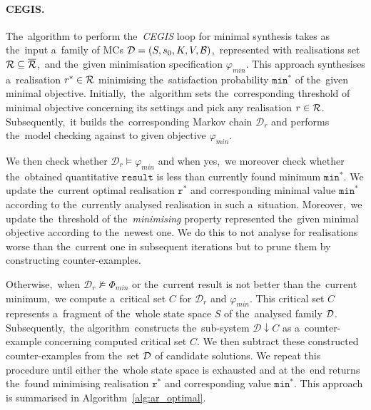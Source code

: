 \paragraph{CEGIS.}
The~algorithm to perform the~\textit{CEGIS} loop for minimal synthesis takes as the~input a~family of MCs $\mathcal{D} = (S,s_{0},K, V, \mathcal{B})$,~represented with realisations set $\mathcal{R} \subseteq \overline{\mathcal{R}}$,~and the~given minimisation specification $\varphi_{min}$.
This approach synthesises a~realisation $r^* \in \mathcal{R}$ minimising the~satisfaction probability $\mathtt{min^*}$ of the~given minimal objective.
Initially,~the~algorithm sets the~corresponding threshold of minimal objective concerning its settings and pick any realisation $r \in \mathcal{R}$.
Subsequently,~it builds the~corresponding Markov chain $\mathcal{D}_r$ and performs the~model checking against to given objective $\varphi_{min}$.

We then check whether $\mathcal{D}_r \models \varphi_{min}$ and when yes,~we moreover check whether the~obtained quantitative $\mathtt{result}$ is less than currently found minimum $\mathtt{min^*}$.
We update the~current optimal realisation $\mathtt{r^*}$ and corresponding minimal value $\mathtt{min^*}$ according to the~currently analysed realisation in such a~situation.
Moreover,~we update the~threshold of the~\textit{minimising} property represented the~given minimal objective according to the~newest one.
We do this to not analyse for realisations worse than the~current one in subsequent iterations but to prune them by constructing counter-examples.

Otherwise,~when $\mathcal{D}_r \not\models \varPhi_{min}$ or the~current result is not better than the~current minimum,~we compute a~critical set $C$ for $\mathcal{D}_r$ and $\varphi_{min}$.
This critical set $C$ represents a~fragment of the~whole state space $S$ of the~analysed family $\mathcal{D}$.
Subsequently,~the algorithm~constructs the~sub-system $\mathcal{D}\!\downarrow\!C$ as a~counter-example concerning computed critical set $C$.
We then subtract these constructed counter-examples from the~set $\mathcal{D}$ of candidate solutions. 
We repeat this procedure until either the~whole state space is exhausted and at the~end returns the~found minimising realisation $\mathtt{r^*}$ and corresponding value $\mathtt{min^*}$.
This approach is summarised in Algorithm~\ref{alg:ar_optimal}.

